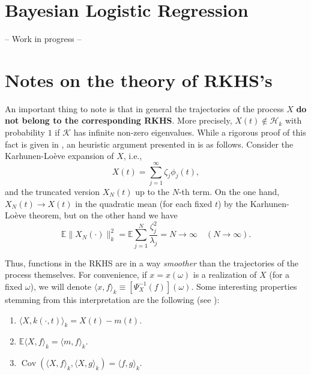 \documentclass[
  a4paper,
	fontsize=11pt, %
	twoside=false, %
  secnumdepth=2,
	numbers=noenddot, %
]{kaohandt}
\DeclareMathOperator{\cov} {Cov}
\begin{document}
\section{Bayesian Logistic Regression}

-- Work in progress --


\renewcommand*{\bibfont}{\small}
\printbibliography[title=Bibliography]%



\appendix

\section{Notes on the theory of RKHS's}

An important thing to note is that in general the trajectories of the process \(X\) \textbf{do not belong to the corresponding RKHS}. More precisely, \(X(t)\notin \mathcal H_k\) with probability \(1\) if \(\mathcal K\) has infinite non-zero eigenvalues. While a rigorous proof of this fact is given in , an heuristic argument presented in  is as follows. Consider the Karhunen-Loève expansion of \(X\), i.e.,
\[
  X(t) = \sum_{j=1}^\infty \zeta_j \phi_j(t),
\]
and the truncated version \(X_N(t)\) up to the \(N\)-th term. On the one hand, \(X_N(t)\to X(t)\) in the quadratic mean (for each fixed \(t\)) by the Karhunen-Loève theorem, but on the other hand we have
\[
  \mathds E\|X_N(\cdot)\|^2_k = \mathds E \sum_{j=1}^N \frac{\zeta_j^2}{\lambda_j} = N \to \infty \quad (N\to\infty).
\]

Thus, functions in the RKHS are in a way \textit{smoother} than the trajectories of the process themselves. For convenience, if \(x=x(\omega)\) is a realization of \(X\) (for a fixed \(\omega\)), we will denote \(\langle x, f\rangle_k \equiv \left[\Psi_X^{-1}(f)\right](\omega)\). Some interesting properties stemming from this interpretation are the following (see ):

\begin{enumerate}

  \item \(\langle X, k(\cdot, t)\rangle_k = X(t) - m(t)\).

  \item \(\mathds{E} \langle X, f\rangle_k = \langle m, f\rangle_k\).

  \item \(\cov \left(\langle X, f \rangle_k , \langle X, g\rangle_k\right) = \langle f, g\rangle_k\).

\end{enumerate}
\end{document}
